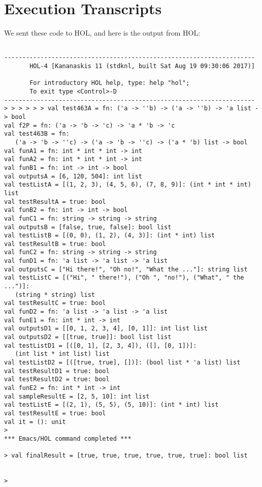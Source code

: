 \documentclass{report}
\begin{document}
\section{Execution Transcripts}
\label{sec:exec-transcr}

We sent these code to HOL, and here is the output from HOL:
\setcounter{sessioncount}{0}
\begin{session}
  \begin{scriptsize}
\begin{verbatim}

---------------------------------------------------------------------
       HOL-4 [Kananaskis 11 (stdknl, built Sat Aug 19 09:30:06 2017)]

       For introductory HOL help, type: help "hol";
       To exit type <Control>-D
---------------------------------------------------------------------
> > > > > > val test463A = fn: ('a -> ''b) -> ('a -> ''b) -> 'a list -> bool
val f2P = fn: ('a -> 'b -> 'c) -> 'a * 'b -> 'c
val test463B = fn:
   ('a -> 'b -> ''c) -> ('a -> 'b -> ''c) -> ('a * 'b) list -> bool
val funA1 = fn: int * int * int -> int
val funA2 = fn: int * int * int -> int
val funB1 = fn: int -> int -> bool
val outputsA = [6, 120, 504]: int list
val testListA = [(1, 2, 3), (4, 5, 6), (7, 8, 9)]: (int * int * int) list
val testResultA = true: bool
val funB2 = fn: int -> int -> bool
val funC1 = fn: string -> string -> string
val outputsB = [false, true, false]: bool list
val testListB = [(0, 0), (1, 2), (4, 3)]: (int * int) list
val testResultB = true: bool
val funC2 = fn: string -> string -> string
val funD1 = fn: 'a list -> 'a list -> 'a list
val outputsC = ["Hi there!", "Oh no!", "What the ..."]: string list
val testListC = [("Hi", " there!"), ("Oh ", "no!"), ("What", " the ...")]:
   (string * string) list
val testResultC = true: bool
val funD2 = fn: 'a list -> 'a list -> 'a list
val funE1 = fn: int * int -> int
val outputsD1 = [[0, 1, 2, 3, 4], [0, 1]]: int list list
val outputsD2 = [[true, true]]: bool list list
val testListD1 = [([0, 1], [2, 3, 4]), ([], [0, 1])]:
   (int list * int list) list
val testListD2 = [([true, true], [])]: (bool list * 'a list) list
val testResultD1 = true: bool
val testResultD2 = true: bool
val funE2 = fn: int * int -> int
val sampleResultE = [2, 5, 10]: int list
val testListE = [(2, 1), (5, 5), (5, 10)]: (int * int) list
val testResultE = true: bool
val it = (): unit
> 
*** Emacs/HOL command completed ***

> val finalResult = [true, true, true, true, true, true]: bool list


> 

\end{verbatim}
  \end{scriptsize}
\end{session}
\end{document}
